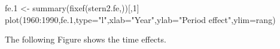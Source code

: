 \documentclass[landscape,letterpaper,9pt]{article}
\begin{document}
%
\newpage
\begin{CVerbatim}
fe.1 <- summary(fixef(stern2.fe,\fbox{\textcolor{red}{effect ="time"}}))[,1]
plot(1960:1990,fe.1,type="l",xlab="Year",ylab="Period effect",ylim=rang)
\end{CVerbatim}
\newpage
The following Figure 
shows the time effects.
\end{document}
